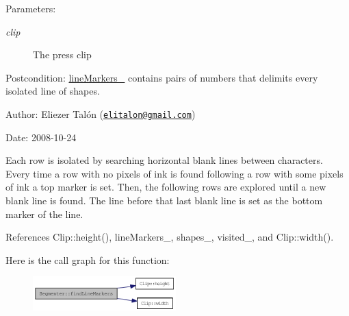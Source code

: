 \begin{Desc}
\item[Parameters:]
\begin{description}
\item[{\em clip}]The press clip\end{description}
\end{Desc}
\begin{Desc}
\item[Postcondition:]\hyperlink{class_segmenter_2789fd760ed7604765b3b147be454c09}{lineMarkers\_\-} contains pairs of numbers that delimits every isolated line of shapes.\end{Desc}
\begin{Desc}
\item[Author:]Eliezer Talón (\href{mailto:elitalon@gmail.com}{\tt elitalon@gmail.com}) \end{Desc}
\begin{Desc}
\item[Date:]2008-10-24\end{Desc}
Each row is isolated by searching horizontal blank lines between characters. Every time a row with no pixels of ink is found following a row with some pixels of ink a top marker is set. Then, the following rows are explored until a new blank line is found. The line before that last blank line is set as the bottom marker of the line. 

References Clip::height(), lineMarkers\_\-, shapes\_\-, visited\_\-, and Clip::width().

Here is the call graph for this function:\nopagebreak
\begin{figure}[H]
\begin{center}
\leavevmode
\includegraphics[width=157pt]{class_segmenter_ad8893282742e811dd7fff172ec03c85_cgraph}
\end{center}
\end{figure}



